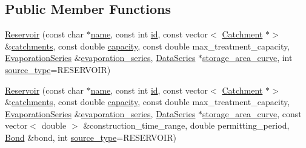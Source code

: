 \subsection*{Public Member Functions}
\begin{DoxyCompactItemize}
\item 
\mbox{\hyperlink{classReservoir_ac9803ae5446e4e9a2631ce66817004cf}{Reservoir}} (const char $\ast$\mbox{\hyperlink{classWaterSource_a846ea74c5b453d014f594d41fee8c765}{name}}, const int \mbox{\hyperlink{classWaterSource_a6eafe5dfefd317877d1244e8a7c6e742}{id}}, const vector$<$ \mbox{\hyperlink{classCatchment}{Catchment}} $\ast$$>$ \&\mbox{\hyperlink{classWaterSource_a8c18c34f23f8a06685c1d12f462ed830}{catchments}}, const double \mbox{\hyperlink{classWaterSource_a2ec257b415b248214a8bce7fc5267723}{capacity}}, const double max\+\_\+treatment\+\_\+capacity, \mbox{\hyperlink{classEvaporationSeries}{Evaporation\+Series}} \&\mbox{\hyperlink{classReservoir_a2d2d9b302c13703309bb798d24136810}{evaporation\+\_\+series}}, \mbox{\hyperlink{classDataSeries}{Data\+Series}} $\ast$\mbox{\hyperlink{classReservoir_a46bd5b750963dfa9a57b247fd77ab8ff}{storage\+\_\+area\+\_\+curve}}, int \mbox{\hyperlink{classWaterSource_afdd12c29fc74ea21dff1f1be9b8c2b7b}{source\+\_\+type}}=R\+E\+S\+E\+R\+V\+O\+IR)
\item 
\mbox{\hyperlink{classReservoir_a2e324b75aacc65d90b214ff7f62dfa89}{Reservoir}} (const char $\ast$\mbox{\hyperlink{classWaterSource_a846ea74c5b453d014f594d41fee8c765}{name}}, const int \mbox{\hyperlink{classWaterSource_a6eafe5dfefd317877d1244e8a7c6e742}{id}}, const vector$<$ \mbox{\hyperlink{classCatchment}{Catchment}} $\ast$$>$ \&\mbox{\hyperlink{classWaterSource_a8c18c34f23f8a06685c1d12f462ed830}{catchments}}, const double \mbox{\hyperlink{classWaterSource_a2ec257b415b248214a8bce7fc5267723}{capacity}}, const double max\+\_\+treatment\+\_\+capacity, \mbox{\hyperlink{classEvaporationSeries}{Evaporation\+Series}} \&\mbox{\hyperlink{classReservoir_a2d2d9b302c13703309bb798d24136810}{evaporation\+\_\+series}}, \mbox{\hyperlink{classDataSeries}{Data\+Series}} $\ast$\mbox{\hyperlink{classReservoir_a46bd5b750963dfa9a57b247fd77ab8ff}{storage\+\_\+area\+\_\+curve}}, const vector$<$ double $>$ \&construction\+\_\+time\+\_\+range, double permitting\+\_\+period, \mbox{\hyperlink{classBond}{Bond}} \&bond, int \mbox{\hyperlink{classWaterSource_afdd12c29fc74ea21dff1f1be9b8c2b7b}{source\+\_\+type}}=R\+E\+S\+E\+R\+V\+O\+IR)
\item 

\end{DoxyCompactItemize}
